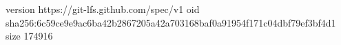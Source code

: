 version https://git-lfs.github.com/spec/v1
oid sha256:6c59ce9e9ac6ba42b2867205a42a703168baf0a91954f171c04dbf79ef3bf4d1
size 174916
